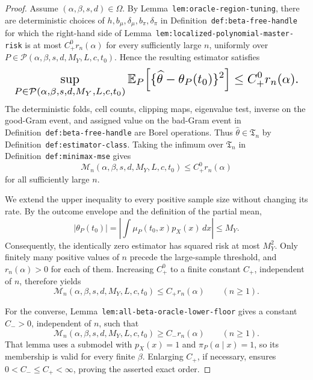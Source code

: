 \documentclass{article}
\begin{document}
\begin{proof}
Assume \((\alpha,\beta,s,d)\in\Omega\). By Lemma~\texttt{lem:oracle-region-tuning}, there are deterministic choices of \(h,b_\mu,\delta_\mu,b_\pi,\delta_\pi\) in Definition~\texttt{def:beta-free-handle} for which the right-hand side of Lemma~\texttt{lem:localized-polynomial-master-risk} is at most \(C_+^0 r_n(\alpha)\) for every sufficiently large \(n\), uniformly over \(P\in\mathcal P(\alpha,\beta,s,d,M_Y,L,c,t_0)\). Hence the resulting estimator satisfies
\[
\makebox[\linewidth][c]{\resizebox{0.98\linewidth}{!}{\(\displaystyle \sup_{P\in\mathcal P(\alpha,\beta,s,d,M_Y,L,c,t_0)}
\mathbb E_P\!\left[\{\widehat\theta-\theta_P(t_0)\}^2\right]
\le C_+^0 r_n(\alpha).\)}}
\]
The deterministic folds, cell counts, clipping maps, eigenvalue test, inverse on the good-Gram event, and assigned value on the bad-Gram event in Definition~\texttt{def:beta-free-handle} are Borel operations. Thus \(\widehat\theta\in\mathfrak T_n\) by Definition~\texttt{def:estimator-class}. Taking the infimum over \(\mathfrak T_n\) in Definition~\texttt{def:minimax-mse} gives
\[
\mathcal M_n(\alpha,\beta,s,d,M_Y,L,c,t_0)
\le C_+^0r_n(\alpha)
\]
for all sufficiently large \(n\).

We extend the upper inequality to every positive sample size without changing its rate. By the outcome envelope and the definition of the partial mean,
\[
\lvert\theta_P(t_0)\rvert
=\left\lvert\int\mu_P(t_0,x)p_X(x)\,dx\right\rvert
\le M_Y.
\]
Consequently, the identically zero estimator has squared risk at most \(M_Y^2\). Only finitely many positive values of \(n\) precede the large-sample threshold, and \(r_n(\alpha)>0\) for each of them. Increasing \(C_+^0\) to a finite constant \(C_+\), independent of \(n\), therefore yields
\[
\mathcal M_n(\alpha,\beta,s,d,M_Y,L,c,t_0)
\le C_+r_n(\alpha)
\qquad(n\ge1).
\]

For the converse, Lemma~\texttt{lem:all-beta-oracle-lower-floor} gives a constant \(C_->0\), independent of \(n\), such that
\[
\mathcal M_n(\alpha,\beta,s,d,M_Y,L,c,t_0)
\ge C_-r_n(\alpha)
\qquad(n\ge1).
\]
That lemma uses a submodel with \(p_X(x)=1\) and \(\pi_P(a\mid x)=1\), so its membership is valid for every finite \(\beta\). Enlarging \(C_+\), if necessary, ensures \(0<C_-\le C_+<\infty\), proving the asserted exact order.


\end{proof}
\end{document}
